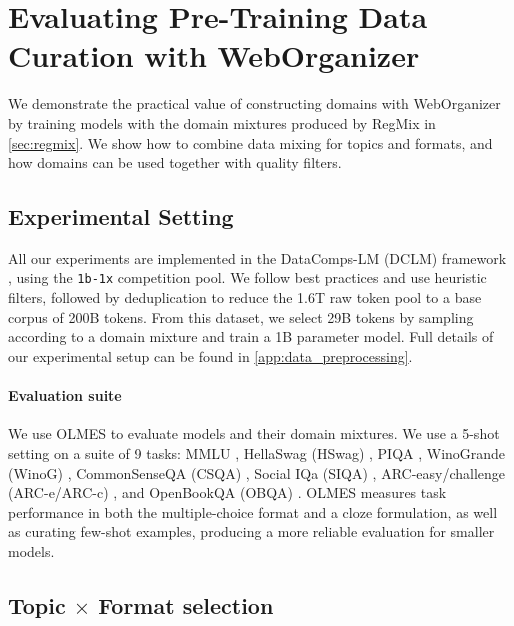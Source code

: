 \section{Evaluating Pre-Training Data Curation with WebOrganizer}
\label{sec:experiments}




We demonstrate the practical value of constructing domains with WebOrganizer by training models with the domain mixtures produced by RegMix in \autoref{sec:regmix}. We show how to combine data mixing for topics and formats, and how domains can be used together with quality filters.

\subsection{Experimental Setting}
All our experiments are implemented in the DataComps-LM (DCLM) framework \citep{li2024datacomplm}, using the \texttt{1b-1x} competition pool.
We follow best practices and use heuristic filters, followed by deduplication to reduce the 1.6T raw token pool to a base corpus of 200B tokens. From this dataset, we select 29B tokens by sampling according to a domain mixture and train a 1B parameter model.
Full details of our experimental setup can be found in \autoref{app:data_preprocessing}.



\paragraph{Evaluation suite} We use OLMES \citep{gu2024olmes} to evaluate models and their domain mixtures. We use a 5-shot setting on a suite of 9 tasks: MMLU \citep{hendrycks2021measuring}, HellaSwag (HSwag) \citep{zellers2019hellaswag}, PIQA \citep{bisk2020piqa}, WinoGrande (WinoG) \citep{sakaguchi2021winogrande}, CommonSenseQA (CSQA) \citep{talmor2019commonsenseqa}, Social IQa (SIQA) \citep{sap2019social}, ARC-easy/challenge (ARC-e/ARC-c) \citep{clark2018think}, and OpenBookQA (OBQA) \citep{mihaylov2018suit}.
OLMES measures task performance in both the multiple-choice format and a cloze formulation, as well as curating few-shot examples, 
producing a more reliable evaluation for smaller models.


\subsection{Topic \texorpdfstring{$\times$}{x} Format selection}

